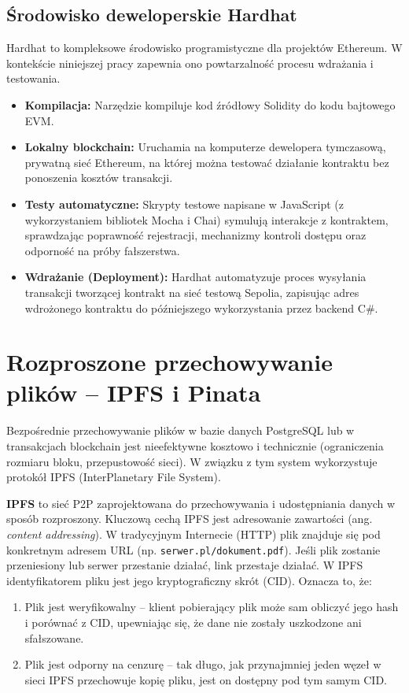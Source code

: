 \documentclass[12pt,a4paper,twoside]{report}
\begin{document}
\subsection{Środowisko deweloperskie Hardhat}
Hardhat to kompleksowe środowisko programistyczne dla projektów Ethereum. W kontekście niniejszej pracy zapewnia ono powtarzalność procesu wdrażania i testowania.
\begin{itemize}
    \item \textbf{Kompilacja:} Narzędzie kompiluje kod źródłowy Solidity do kodu bajtowego EVM.
    \item \textbf{Lokalny blockchain:} Uruchamia na komputerze dewelopera tymczasową, prywatną sieć Ethereum, na której można testować działanie kontraktu bez ponoszenia kosztów transakcji.
    \item \textbf{Testy automatyczne:} Skrypty testowe napisane w JavaScript (z wykorzystaniem bibliotek Mocha i Chai) symulują interakcje z kontraktem, sprawdzając poprawność rejestracji, mechanizmy kontroli dostępu oraz odporność na próby fałszerstwa.
    \item \textbf{Wdrażanie (Deployment):} Hardhat automatyzuje proces wysyłania transakcji tworzącej kontrakt na sieć testową Sepolia, zapisując adres wdrożonego kontraktu do późniejszego wykorzystania przez backend C\#.
\end{itemize}

\section{Rozproszone przechowywanie plików -- IPFS i Pinata}

Bezpośrednie przechowywanie plików w bazie danych PostgreSQL lub w transakcjach blockchain jest nieefektywne kosztowo i technicznie (ograniczenia rozmiaru bloku, przepustowość sieci). W związku z tym system wykorzystuje protokół IPFS (InterPlanetary File System).

\textbf{IPFS} to sieć P2P zaprojektowana do przechowywania i udostępniania danych w sposób rozproszony. Kluczową cechą IPFS jest adresowanie zawartości (ang. \textit{content addressing}). W tradycyjnym Internecie (HTTP) plik znajduje się pod konkretnym adresem URL (np. \texttt{serwer.pl/dokument.pdf}). Jeśli plik zostanie przeniesiony lub serwer przestanie działać, link przestaje działać. W IPFS identyfikatorem pliku jest jego kryptograficzny skrót (CID). Oznacza to, że:
\begin{enumerate}
    \item Plik jest weryfikowalny -- klient pobierający plik może sam obliczyć jego hash i porównać z CID, upewniając się, że dane nie zostały uszkodzone ani sfałszowane.
    \item Plik jest odporny na cenzurę -- tak długo, jak przynajmniej jeden węzeł w sieci IPFS przechowuje kopię pliku, jest on dostępny pod tym samym CID.
\end{enumerate}
\end{document}
